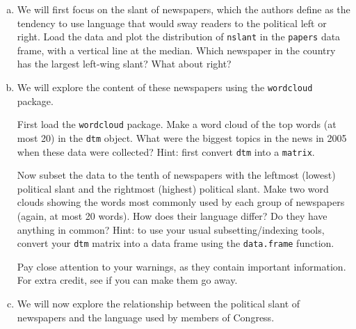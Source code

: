 \documentclass[11pt]{article}
\begin{document}
\begin{enumerate}[a.]
\item We will first focus on the slant of newspapers, which the authors define as the tendency to use language that would sway readers to the political left or right. Load the data and plot the distribution of {\tt nslant} in the {\tt papers} data frame, with a vertical line at the median. Which newspaper in the country has the largest left-wing slant? What about right? 
\item We will explore the content of these newspapers using the {\tt wordcloud} package. 

First load the {\tt wordcloud} package. Make a word cloud of the top words (at most 20) in the {\tt dtm} object. What were the biggest topics in the news in 2005 when these data were collected? Hint: first convert {\tt dtm} into a {\tt matrix}.

Now subset the data to the tenth of newspapers with the leftmost (lowest) political slant and the rightmost (highest) political slant. Make two word clouds showing the words most commonly used by each group of newspapers (again, at most 20 words). How does their language differ? Do they have anything in common? 
Hint: to use your usual subsetting/indexing tools, convert your {\tt dtm} matrix into a data frame using the {\tt data.frame} function. 

Pay close attention to your warnings, as they contain important information. For extra credit, see if you can make them go away. 
\item We will now explore the relationship between the political slant of newspapers and the language used by members of Congress. 


\end{enumerate}
\end{document}
